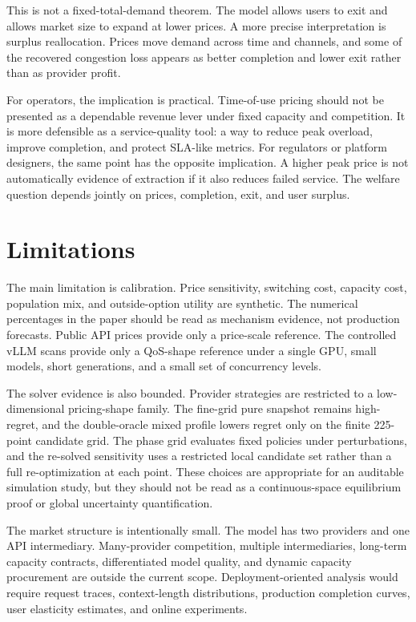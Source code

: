 \documentclass[11pt,a4paper]{article}
\begin{document}
This is not a fixed-total-demand theorem. The model allows users to exit and allows market size to expand at lower prices. A more precise interpretation is surplus reallocation. Prices move demand across time and channels, and some of the recovered congestion loss appears as better completion and lower exit rather than as provider profit.

For operators, the implication is practical. Time-of-use pricing should not be presented as a dependable revenue lever under fixed capacity and competition. It is more defensible as a service-quality tool: a way to reduce peak overload, improve completion, and protect SLA-like metrics. For regulators or platform designers, the same point has the opposite implication. A higher peak price is not automatically evidence of extraction if it also reduces failed service. The welfare question depends jointly on prices, completion, exit, and user surplus.

\section{Limitations}
\label{sec:limitations}

The main limitation is calibration. Price sensitivity, switching cost, capacity cost, population mix, and outside-option utility are synthetic. The numerical percentages in the paper should be read as mechanism evidence, not production forecasts. Public API prices provide only a price-scale reference. The controlled vLLM scans provide only a QoS-shape reference under a single GPU, small models, short generations, and a small set of concurrency levels.

The solver evidence is also bounded. Provider strategies are restricted to a low-dimensional pricing-shape family. The fine-grid pure snapshot remains high-regret, and the double-oracle mixed profile lowers regret only on the finite 225-point candidate grid. The phase grid evaluates fixed policies under perturbations, and the re-solved sensitivity uses a restricted local candidate set rather than a full re-optimization at each point. These choices are appropriate for an auditable simulation study, but they should not be read as a continuous-space equilibrium proof or global uncertainty quantification.

The market structure is intentionally small. The model has two providers and one API intermediary. Many-provider competition, multiple intermediaries, long-term capacity contracts, differentiated model quality, and dynamic capacity procurement are outside the current scope. Deployment-oriented analysis would require request traces, context-length distributions, production completion curves, user elasticity estimates, and online experiments.
\end{document}
